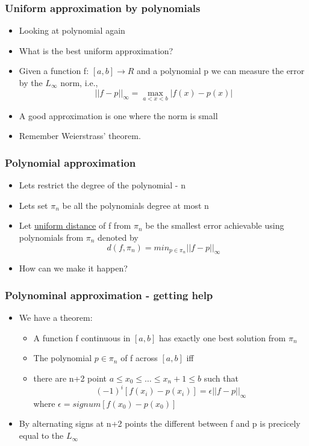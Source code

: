 \documentclass[10pt]{beamer}
\begin{document}
\begin{frame}
  \frametitle{Uniform approximation by polynomials}
  \begin{itemize}
  \item Looking at polynomial again
  \item What is the best uniform approximation? 
  \item Given a function f: $[a,b] \rightarrow R$ and a polynomial p we can measure the error by the $L_{\infty}$ norm, i.e.,
    \[
      ||f-p||_{\infty} = \max_{a<x<b} | f(x) - p(x) |
    \]
  \item A good approximation is one where the norm is small
  \item Remember Weierstrass' theorem. 
  \end{itemize}
\end{frame}

\begin{frame}
  \frametitle{Polynomial approximation}
  \begin{itemize}
  \item Lets restrict the degree of the polynomial - n
  \item Lets set $\pi_n$ be all the polynomials degree at most n
  \item Let {\underline{uniform distance}} of f from $\pi_n$ be the smallest
    error achievable using polynomials from $\pi_n$ denoted by
    \[
      d(f,\pi_n) = min_{p\in \pi_n} ||f - p ||_{\infty}
    \]
    
  \item How can we make it happen? 
  \end{itemize}
\end{frame}

\begin{frame}
  \frametitle{Polynominal approximation - getting help}
  \begin{itemize}
  \item We have a theorem:
    \begin{itemize}
    \item A function f continuous in $[a,b]$ has exactly one best
      solution from $\pi_n$
    \item The polynomial $p \in \pi_n$ of f across $[a,b]$ iff
    \item there are n+2 point $a \leq x_0 \leq \ldots \leq x_n+1 \leq b$ such that
      \[
        (-1)^i [ f(x_i) - p(x_i) ] = \epsilon ||f-p||_{\infty}
      \]
      where $\epsilon = signum[f(x_0)-p(x_0)]$ 
    \end{itemize}
  \item By alternating signs at n+2 points the different between f and p is precicely equal to the $L_{\infty}$
  \end{itemize}
\end{frame}
\end{document}
